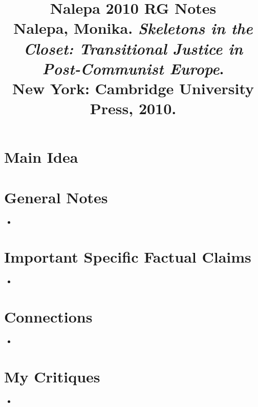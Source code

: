 \documentclass[12pt]{article}
\title{\textbf{Nalepa 2010 RG Notes}\\
\large Nalepa, Monika. \textit{Skeletons in the Closet: Transitional Justice in Post-Communist Europe}.\\
New York: Cambridge University Press, 2010.}
\author{}
\date{}
\begin{document}
\maketitle

\section{Main Idea}



\section{General Notes}

\begin{itemize}[leftmargin=*, itemsep=4pt]
    \item
\end{itemize}


\section{Important Specific Factual Claims}

\begin{itemize}[leftmargin=*, itemsep=4pt]
    \item
\end{itemize}


\section{Connections}

\begin{itemize}[leftmargin=*, itemsep=4pt]
    \item
\end{itemize}


\section{My Critiques}

\begin{itemize}[leftmargin=*, itemsep=4pt]
    \item
\end{itemize}
\end{document}
